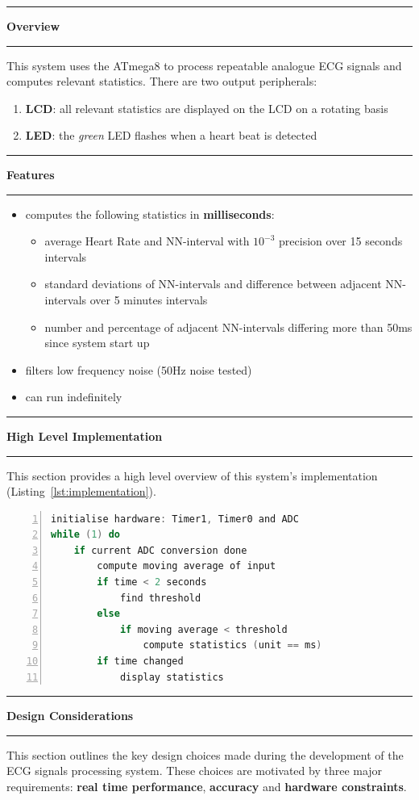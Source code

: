 \documentclass[11pt]{article}
\newcommand\question[2]{\vspace{.25in}\hrule\textbf{#1}\vspace{.5em}\hrule\vspace{.10in}}
\begin{document}
%
\newpage
\question{Overview}{}
This system uses the ATmega8 to process repeatable analogue ECG signals and computes relevant statistics. There are two output peripherals:
\begin{enumerate}
\item \textbf{LCD}: all relevant statistics are displayed on the LCD on a rotating basis
\item \textbf{LED}: the \textit{green} LED flashes when a heart beat is detected
\end{enumerate}
%
%
\question{Features}{}
\begin{itemize}
\item computes the following statistics in \textbf{milliseconds}:
	\begin{itemize}
	\item average Heart Rate and NN-interval with $10^{-3}$ precision over 15 seconds intervals
	\item standard deviations of NN-intervals and difference between adjacent NN-intervals over 5 minutes intervals
	\item number and percentage of adjacent NN-intervals differing more than 50ms since system start up
	\end{itemize}
%
\item filters low frequency noise (50Hz noise tested)
\item can run indefinitely
\end{itemize}
%
\question{High Level Implementation}{}
This section provides a high level overview of this system's implementation (Listing~\ref{lst:implementation}).
\begin{lstlisting}[language=C, numbers=left, stepnumber=1, caption=High Level System implementation, label=lst:implementation]
initialise hardware: Timer1, Timer0 and ADC
while (1) do
	if current ADC conversion done
		compute moving average of input
		if time < 2 seconds
			find threshold
		else
			if moving average < threshold
				compute statistics (unit == ms)
		if time changed
			display statistics
\end{lstlisting}
%
\question{Design Considerations}{}
This section outlines the key design choices made during the development of the ECG signals processing system. These choices are motivated by three major requirements: \textbf{real time performance}, \textbf{accuracy} and \textbf{hardware constraints}. 
\end{document}
